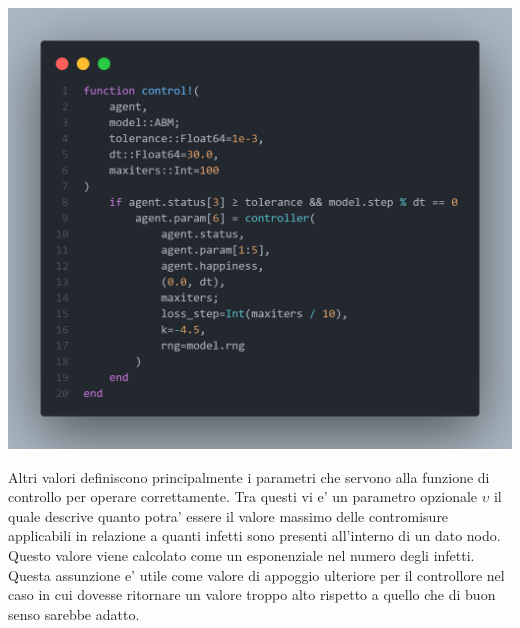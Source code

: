 \begin{minipage}{\linewidth}
	\centering
	\includegraphics[width=\textwidth]{img/controller_neuralode.png}
	\label{fig:controller_abm}
\end{minipage}

Altri valori definiscono principalmente i parametri che servono alla funzione di controllo per operare correttamente.
Tra questi vi e' un parametro opzionale $\upsilon$ il quale descrive quanto potra' essere il valore massimo delle 
contromisure applicabili in relazione a quanti infetti sono presenti all'interno di un dato nodo. Questo valore viene 
calcolato come un esponenziale nel numero degli infetti. Questa assunzione e' utile come valore di appoggio ulteriore 
per il controllore nel caso in cui dovesse ritornare un valore troppo alto rispetto a quello che di buon senso sarebbe 
adatto. 

